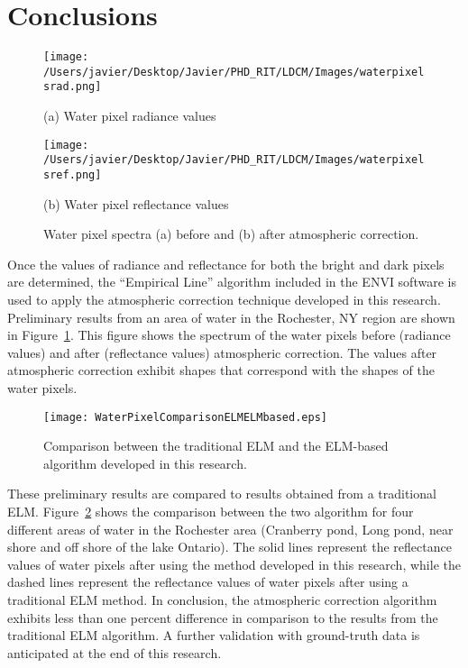 \documentclass{article}
\begin{document}
\section{Conclusions}
\label{sec:conc}
\begin{figure}[htb]
  \begin{minipage}[c]{0.48\linewidth}
    \centering
  \texttt{[image: /Users/javier/Desktop/Javier/PHD\_RIT/LDCM/Images/waterpixelsrad.png]}
    \centerline{(a) Water pixel radiance values}\medskip
  \end{minipage}
  \hfill
  \begin{minipage}[d]{0.48\linewidth}
    \centering
  \texttt{[image: /Users/javier/Desktop/Javier/PHD\_RIT/LDCM/Images/waterpixelsref.png]}
    \centerline{(b) Water pixel reflectance values}\medskip
  \end{minipage}
  \caption{Water pixel spectra (a) before and (b) after atmospheric correction.}
  \label{fig:refrad}
\end{figure}
Once the values of radiance and reflectance for both the bright and dark pixels are determined, the ``Empirical Line'' algorithm included in the ENVI software is used to apply the atmospheric correction technique developed in this research. Preliminary results from an area of water in the Rochester, NY region are shown in Figure~\ref{fig:refrad}. This figure shows the spectrum of the water pixels before (radiance values) and after (reflectance values) atmospheric correction. The values after atmospheric correction exhibit shapes that correspond with the shapes of the water pixels. 
\begin{figure}[htb]
  \centering
  \texttt{[image: WaterPixelComparisonELMELMbased.eps]}
  \caption{Comparison between the traditional ELM and the ELM-based algorithm developed in this research. \label{fig:ELMcomp} } 
\end{figure}

These preliminary results are compared to results obtained from a traditional ELM.
Figure~\ref{fig:ELMcomp} shows the comparison between the two algorithm for four different areas of water in the Rochester area (Cranberry pond, Long pond, near shore and off shore of the lake Ontario). The solid lines represent the reflectance values of water pixels after using the method developed in this research, while the dashed lines represent the reflectance values of water pixels after using a traditional ELM method. In conclusion, the atmospheric correction algorithm exhibits less than one percent difference in comparison to the results from the traditional ELM algorithm. A further validation with ground-truth data is anticipated at the end of this research. 


\end{document}
